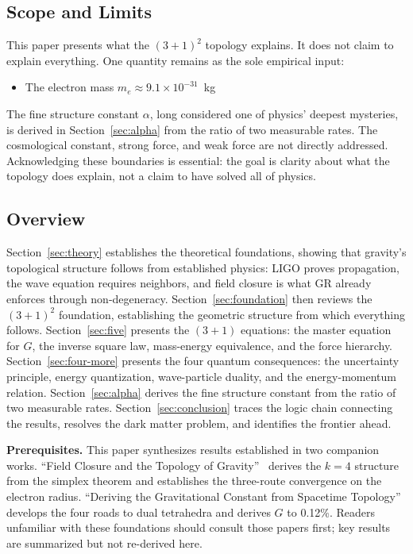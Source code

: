 \documentclass[aps,prd,preprint,superscriptaddress,showpacs,preprintnumbers,amsmath,amssymb,nofootinbib]{revtex4-2}
\begin{document}
\subsection{Scope and Limits}
\label{subsec:limits}

This paper presents what the $(3+1)^2$ topology explains. It does not claim to explain everything. One quantity remains as the sole empirical input:
\begin{itemize}
\item The electron mass $m_e \approx 9.1 \times 10^{-31}$~kg
\end{itemize}

The fine structure constant $\alpha$, long considered one of physics' deepest mysteries, is derived in Section~\ref{sec:alpha} from the ratio of two measurable rates. The cosmological constant, strong force, and weak force are not directly addressed. Acknowledging these boundaries is essential: the goal is clarity about what the topology does explain, not a claim to have solved all of physics.

\subsection{Overview}
\label{subsec:structure}

Section~\ref{sec:theory} establishes the theoretical foundations, showing that gravity's topological structure follows from established physics: LIGO proves propagation, the wave equation requires neighbors, and field closure is what GR already enforces through non-degeneracy. Section~\ref{sec:foundation} then reviews the $(3+1)^2$ foundation, establishing the geometric structure from which everything follows. Section~\ref{sec:five} presents the $(3+1)$ equations: the master equation for $G$, the inverse square law, mass-energy equivalence, and the force hierarchy. Section~\ref{sec:four-more} presents the four quantum consequences: the uncertainty principle, energy quantization, wave-particle duality, and the energy-momentum relation. Section~\ref{sec:alpha} derives the fine structure constant from the ratio of two measurable rates. Section~\ref{sec:conclusion} traces the logic chain connecting the results, resolves the dark matter problem, and identifies the frontier ahead.

\textbf{Prerequisites.} This paper synthesizes results established in two companion works. ``Field Closure and the Topology of Gravity''~\cite{paper5} derives the $k=4$ structure from the simplex theorem and establishes the three-route convergence on the electron radius. ``Deriving the Gravitational Constant from Spacetime Topology''~\cite{paper6} develops the four roads to dual tetrahedra and derives $G$ to 0.12\%. Readers unfamiliar with these foundations should consult those papers first; key results are summarized but not re-derived here.
\end{document}
